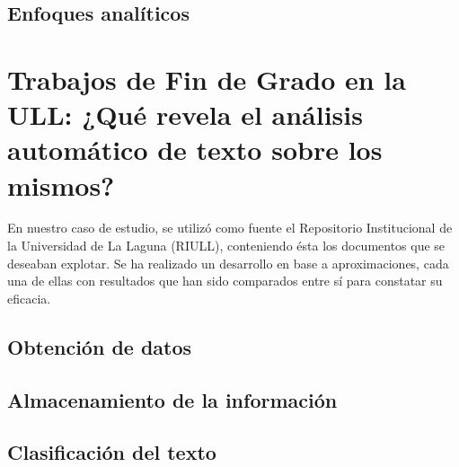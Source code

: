 

\subsection{Enfoques analíticos}



\section{Trabajos de Fin de Grado en la ULL: ¿Qué revela el análisis automático de texto sobre los mismos?}
En nuestro caso de estudio, se utilizó como fuente el Repositorio Institucional de la Universidad de La Laguna (RIULL), conteniendo ésta los documentos que se deseaban explotar.
%
Se ha realizado un desarrollo en base a aproximaciones, cada una de ellas con resultados que han sido comparados entre sí para constatar su eficacia.

\subsection{Obtención de datos}






\subsection{Almacenamiento de la información}


\subsection{Clasificación del texto}
